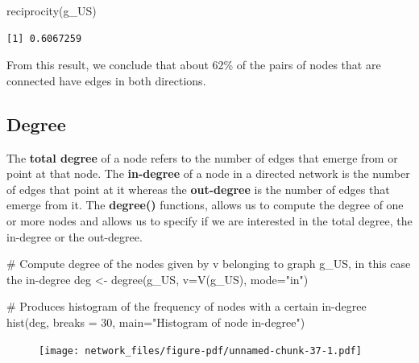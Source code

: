 \documentclass[
  letterpaper,
  DIV=11,
  numbers=noendperiod]{scrreprt}
\newenvironment{Shaded}{\begin{snugshade}}{\end{snugshade}}
\newcommand{\AttributeTok}[1]{\textcolor[rgb]{0.40,0.45,0.13}{#1}}
\newcommand{\CommentTok}[1]{\textcolor[rgb]{0.37,0.37,0.37}{#1}}
\newcommand{\DecValTok}[1]{\textcolor[rgb]{0.68,0.00,0.00}{#1}}
\newcommand{\FunctionTok}[1]{\textcolor[rgb]{0.28,0.35,0.67}{#1}}
\newcommand{\NormalTok}[1]{\textcolor[rgb]{0.00,0.23,0.31}{#1}}
\newcommand{\OtherTok}[1]{\textcolor[rgb]{0.00,0.23,0.31}{#1}}
\newcommand{\StringTok}[1]{\textcolor[rgb]{0.13,0.47,0.30}{#1}}
\begin{document}
\begin{Shaded}
\begin{Highlighting}[]
\FunctionTok{reciprocity}\NormalTok{(g\_US)}
\end{Highlighting}
\end{Shaded}

\begin{verbatim}
[1] 0.6067259
\end{verbatim}

From this result, we conclude that about 62\% of the pairs of nodes that
are connected have edges in both directions.

\hypertarget{degree}{%
\subsection{Degree}\label{degree}}

The \textbf{total degree} of a node refers to the number of edges that
emerge from or point at that node. The \textbf{in-degree} of a node in a
directed network is the number of edges that point at it whereas the
\textbf{out-degree} is the number of edges that emerge from it. The
\textbf{degree()} functions, allows us to compute the degree of one or
more nodes and allows us to specify if we are interested in the total
degree, the in-degree or the out-degree.

\begin{Shaded}
\begin{Highlighting}[]
\CommentTok{\# Compute degree of the nodes given by v belonging to graph g\_US, in this case the in{-}degree}
\NormalTok{deg }\OtherTok{\textless{}{-}} \FunctionTok{degree}\NormalTok{(g\_US, }\AttributeTok{v=}\FunctionTok{V}\NormalTok{(g\_US), }\AttributeTok{mode=}\StringTok{"in"}\NormalTok{)}

\CommentTok{\# Produces histogram of the frequency of nodes with a certain in{-}degree}
\FunctionTok{hist}\NormalTok{(deg, }\AttributeTok{breaks =} \DecValTok{30}\NormalTok{, }\AttributeTok{main=}\StringTok{"Histogram of node in{-}degree"}\NormalTok{)}
\end{Highlighting}
\end{Shaded}

\begin{figure}[H]

{\centering \texttt{[image: network\_files/figure-pdf/unnamed-chunk-37-1.pdf]}

}

\end{figure}
\end{document}
